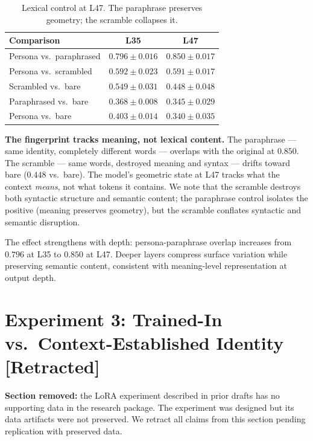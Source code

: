 \documentclass[11pt,a4paper]{article}
\begin{document}
\begin{table}[H]
\centering
\caption{Lexical control at L47. The paraphrase preserves geometry;
the scramble collapses it.}
\label{tab:lexical}
\begin{tabular}{lcc}
\toprule
Comparison & L35 & L47 \\
\midrule
Persona vs.\ paraphrased & $0.796 \pm 0.016$ & $\mathbf{0.850 \pm 0.017}$ \\
Persona vs.\ scrambled & $0.592 \pm 0.023$ & $0.591 \pm 0.017$ \\
Scrambled vs.\ bare & $0.549 \pm 0.031$ & $0.448 \pm 0.048$ \\
Paraphrased vs.\ bare & $0.368 \pm 0.008$ & $0.345 \pm 0.029$ \\
Persona vs.\ bare & $0.403 \pm 0.014$ & $0.340 \pm 0.035$ \\
\bottomrule
\end{tabular}
\end{table}

\textbf{The fingerprint tracks meaning, not lexical content.} The
paraphrase --- same identity, completely different words --- overlaps with
the original at $0.850$. The scramble --- same words, destroyed meaning
and syntax --- drifts toward bare ($0.448$ vs.\ bare). The model's
geometric state at L47 tracks what the context \emph{means}, not what
tokens it contains. We note that the scramble destroys both syntactic
structure and semantic content; the paraphrase control isolates the
positive (meaning preserves geometry), but the scramble conflates
syntactic and semantic disruption.

The effect strengthens with depth: persona-paraphrase overlap increases
from $0.796$ at L35 to $0.850$ at L47. Deeper layers compress surface
variation while preserving semantic content, consistent with meaning-level
representation at output depth.

\section{Experiment 3: Trained-In vs.\ Context-Established Identity [Retracted]}
\label{sec:lora}

\textbf{Section removed:} the LoRA experiment described in prior drafts
has no supporting data in the research package. The experiment was
designed but its data artifacts were not preserved. We retract all claims
from this section pending replication with preserved data.
\end{document}

